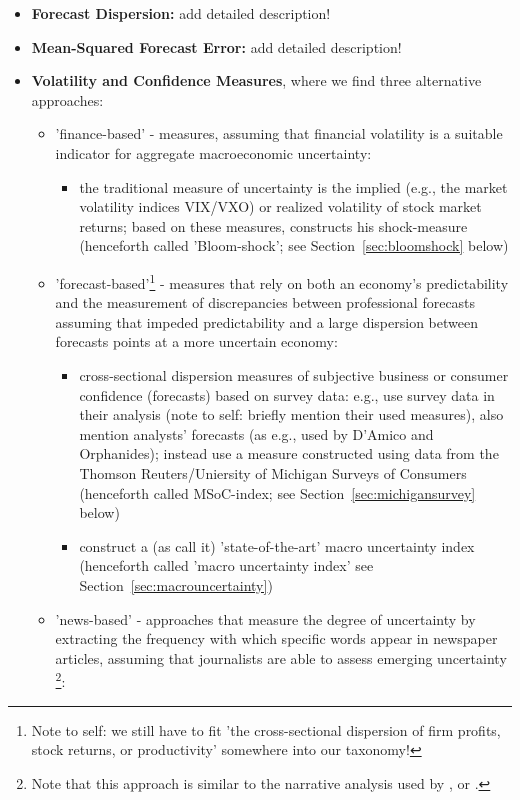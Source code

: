 \documentclass[a4paper,12pt,oneside,pointednumbers,bibtotoc,bigheadings,liststotoc]{scrbook}
\begin{document}
\begin{itemize}
	\item \textbf{Forecast Dispersion:} add detailed description!
	\item \textbf{Mean-Squared Forecast Error:} add detailed description!
	\item \textbf{Volatility and Confidence Measures}, where we find three alternative approaches:
		\begin{itemize}
			\item 'finance-based' - measures, assuming that financial volatility is a suitable indicator for aggregate macroeconomic uncertainty: 
			\begin{itemize}
				\item the traditional measure of uncertainty is the implied (e.g., the market volatility indices VIX/VXO) or realized volatility of stock market returns; based on these measures, \citet{bloom:09} constructs his shock-measure (henceforth called 'Bloom-shock'; see Section~\ref{sec:bloomshock} below)
			\end{itemize}
			\item 'forecast-based'\footnote{Note to self: we still have to fit 'the cross-sectional dispersion of firm profits, stock returns, or productivity' somewhere into our taxonomy!} - measures that rely on both an economy's predictability and the measurement of discrepancies between professional forecasts assuming that impeded predictability and a large dispersion between forecasts points at a more uncertain economy:
			\begin{itemize}
				\item cross-sectional dispersion measures of subjective business or consumer confidence (forecasts) based on survey data: e.g., \citet{bachmannetal:13} use survey data in their analysis (note to self: briefly mention their used measures), \citet{juradoetal:15} also mention analysts' forecasts (as e.g., used by D'Amico and Orphanides); \citet{leducandliu:16} instead use a measure constructed using data from the Thomson Reuters/Uniersity of Michigan Surveys of Consumers (henceforth called MSoC-index; see Section~\ref{sec:michigansurvey} below)
				\item \citet{juradoetal:15} construct a (as \citet{orlikandveldkamp:14} call it) 'state-of-the-art' macro uncertainty index (henceforth called 'macro uncertainty index' see Section~\ref{sec:macrouncertainty})
			\end{itemize}
			\item 'news-based' - approaches that measure the degree of uncertainty by extracting the frequency with which specific words appear in newspaper articles, assuming that journalists are able to assess emerging uncertainty \footnote{Note that this approach is similar to the narrative analysis used by \citet{romerandromer:04}, \citet{romandrom:17} or \citet{ramey:09}.}: 

\end{itemize}
\end{itemize}
\end{document}
